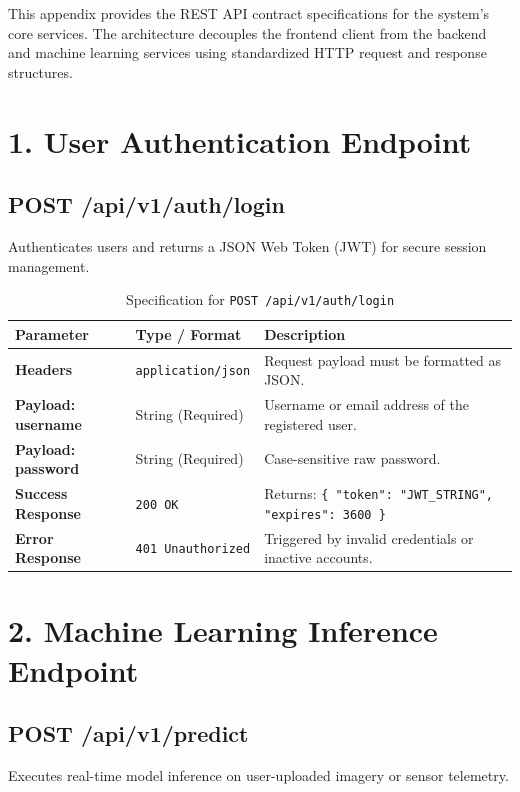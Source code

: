 This appendix provides the REST API contract specifications for the system's core services. The architecture decouples the frontend client from the backend and machine learning services using standardized HTTP request and response structures.

\section*{1. User Authentication Endpoint}
\subsection*{POST /api/v1/auth/login}
Authenticates users and returns a JSON Web Token (JWT) for secure session management.

\begin{table}[htbp]
  \centering
  \caption{Specification for \texttt{POST /api/v1/auth/login}}
  \label{tab:api-login}
  \small
  \renewcommand{\arraystretch}{1.1}
  \begin{tabularx}{\textwidth}{|l|l|X|}
    \hline
    \textbf{Parameter} & \textbf{Type / Format} & \textbf{Description} \\
    \hline
    \textbf{Headers} & \texttt{application/json} & Request payload must be formatted as JSON. \\
    \textbf{Payload: username} & String (Required) & Username or email address of the registered user. \\
    \textbf{Payload: password} & String (Required) & Case-sensitive raw password. \\
    \hline
    \textbf{Success Response} & \texttt{200 OK} & Returns: \texttt{\{ "token": "JWT\_STRING", "expires": 3600 \}} \\
    \textbf{Error Response} & \texttt{401 Unauthorized} & Triggered by invalid credentials or inactive accounts. \\
    \hline
  \end{tabularx}
\end{table}

\section*{2. Machine Learning Inference Endpoint}
\subsection*{POST /api/v1/predict}
Executes real-time model inference on user-uploaded imagery or sensor telemetry.

